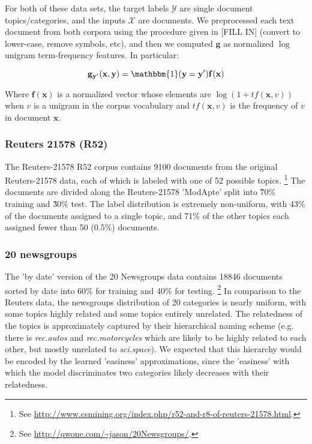 \documentclass{article} %
\begin{document}
For both of these data sets, the target labels $\mathcal{Y}$ are 
single document topics/categories, and the inputs $\mathcal{X}$ are
documents.  We preprocessed each text document from both corpora 
using the procedure given in [FILL IN] (convert to lower-case, 
remove symbols, etc), and then we computed $\mathbf{g}$ as normalized
$\log$ unigram term-frequency features.  In particular:

\begin{equation}
\mathbf{g}_{\mathbf{y'}}(\mathbf{x},\mathbf{y}) = \mathbbm{1}(\mathbf{y}=\mathbf{y'})\mathbf{f}(\mathbf{x})
\end{equation}

Where $\mathbf{f}(\mathbf{x})$ is a normalized vector whose elements 
are $\log(1+tf(\mathbf{x},v))$ when $v$ is a unigram in the corpus 
vocabulary and $tf(\mathbf{x},v)$ is the frequency of $v$ in document
 $\mathbf{x}$.

\subsubsection{Reuters 21578 (R52)}

The Reuters-21578 R52 corpus contains 9100 documents from the original
Reuters-21578 data, each of which is labeled with one of 52 possible topics.
\footnote{See 
\url{http://www.csmining.org/index.php/r52-and-r8-of-reuters-21578.html}.}  
The documents are divided along the Reuters-21578 'ModApte' split
into \~70\% training and \~30\% test.  The label distribution is extremely
non-uniform, with 43\% of the documents assigned to a single topic, and
71\% of the other topics each assigned fewer than 50 (0.5\%) documents.

\subsubsection{20 newsgroups}

The 'by date' version of the 20 Newsgroups data contains 
18846 documents sorted by date into 60\% for training and 40\% for testing.  
\footnote{See \url{http://qwone.com/~jason/20Newsgroups/}.} In comparison
to the Reuters data, the newsgroups distribution of 20 categories is
nearly uniform, with some topics highly related and some topics entirely
unrelated.  The relatedness of the topics is approximately captured by
their hierarchical naming scheme (e.g. there is \textit{rec.autos} and
\textit{rec.motorcycles} which are likely to be highly related to each
other, but mostly unrelated to \textit{sci.space}).  We expected that
this hierarchy would be encoded by the learned 'easiness' approximations,
since the 'easiness' with which the model discriminates two categories
likely decreases with their relatedness.
\end{document}
